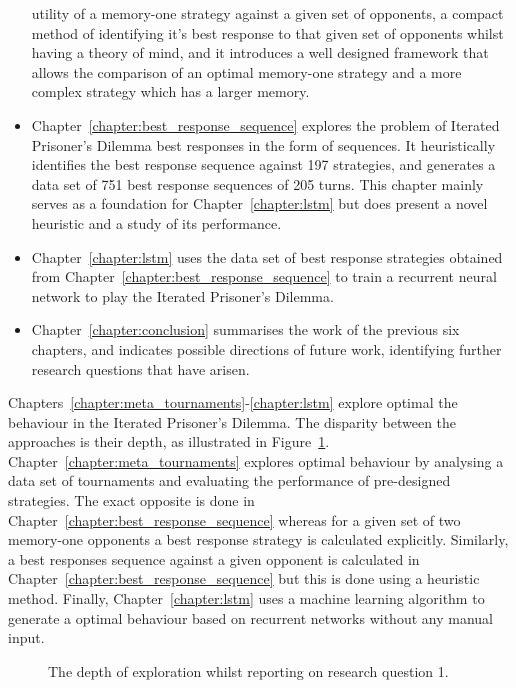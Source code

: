 \begin{itemize}
    utility of a memory-one strategy against a given set of opponents, a
    compact method of identifying it's best response to that given set of
    opponents whilst having a theory of mind, and it introduces a well designed
    framework that allows the comparison of an optimal memory-one strategy and a
    more complex strategy which has a larger memory.  %
    \item Chapter~\ref{chapter:best_response_sequence} explores the problem of
    Iterated Prisoner's Dilemma best responses in the form of sequences.
    It heuristically identifies the best response sequence against 197 strategies,
    and generates a data set of 751 best response sequences of 205 turns. This chapter mainly serves as a foundation for Chapter~\ref{chapter:lstm} but does present a novel heuristic and a study of its performance.
    \item Chapter~\ref{chapter:lstm} uses the data set of best response strategies
    obtained from Chapter~\ref{chapter:best_response_sequence} to train a recurrent
    neural network to play the Iterated Prisoner's Dilemma.
    \item Chapter~\ref{chapter:conclusion} summarises the work of the previous
    six chapters, and indicates possible directions of future work, identifying
    further research questions that have arisen.
\end{itemize}

Chapters~\ref{chapter:meta_tournaments}-\ref{chapter:lstm} explore optimal the
behaviour in the Iterated Prisoner's Dilemma. The disparity between the
approaches is their depth, as illustrated in Figure~\ref{fig:depth_structure}.
Chapter~\ref{chapter:meta_tournaments} explores optimal behaviour
by analysing a data set of tournaments and evaluating the performance of
pre-designed strategies. The exact opposite is done in
Chapter~\ref{chapter:best_response_sequence} whereas for a given set of two
memory-one opponents a best response strategy is calculated explicitly.
Similarly, a best responses sequence against a given opponent is calculated in
Chapter~\ref{chapter:best_response_sequence} but this is done using a heuristic
method. Finally, Chapter~\ref{chapter:lstm} uses a machine learning algorithm
to generate a optimal behaviour based on recurrent networks without any manual
input.

\begin{figure}[!hbtp]
    \centering
    
    \caption{The depth of exploration whilst reporting on research question 1.}\label{fig:depth_structure}
\end{figure}

